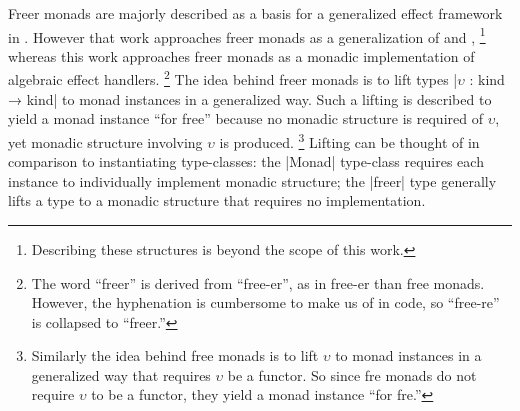 Freer monads are majorly described as a basis for a generalized effect framework in \cite{KiselyovIshii2015}.
However that work approaches freer monads as a generalization of  and ,%
\footnote{
  Describing these structures is beyond the scope of this work.
}
whereas this work approaches freer monads as a monadic implementation of algebraic effect handlers.%
\footnote{
  The word ``freer'' is derived from ``free-er'', as in free-er than free monads.
  However, the hyphenation is cumbersome to make us of in code, so ``free-re'' is collapsed to ``freer.''
}
The idea behind freer monads is to lift types \code|$υ$ : kind → kind| to monad instances in a generalized way.
Such a lifting is described to yield a monad instance ``for free'' because no monadic structure is required of $υ$, yet monadic structure involving $υ$ is produced.%
\footnote{
  Similarly the idea behind free monads is to lift $υ$ to monad instances in a generalized way that requires $υ$ be a functor.
  So since fre monads do not require $υ$ to be a functor, they yield a monad instance ``for fre.''
}
Lifting can be thought of in comparison to instantiating type-classes:
the \code|Monad| type-class requires each instance to individually implement monadic structure;
the \code|freer| type generally lifts a type to a monadic structure that requires no implementation.

